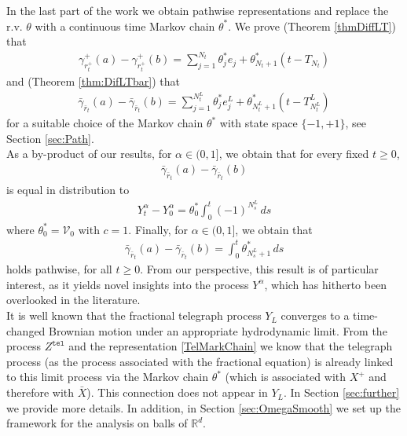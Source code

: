 \documentclass[10pt,a4paper]{article}
\numberwithin{equation}{section}
\theoremstyle{plain}
\theoremstyle{remark}
\begin{document}
In the last part of the work we obtain pathwise representations and replace the r.v. $\theta$ with a continuous time Markov chain $\theta^*$. We prove (Theorem \ref{thmDiffLT}) that
\begin{align}
\gamma^+_{r^+_t}(a) - \gamma^+_{r^+_t}(b) = \sum_{j=1}^{N_t} \theta^*_j e_j + \theta^*_{N_t + 1} \left( t - T_{N_t} \right)
\label{MarkChain}
\end{align}
and (Theorem \ref{thm:DifLTbar}) that
\begin{align}
\bar{\gamma}_{\bar{r}_t}(a) - \bar{\gamma}_{\bar{r}_t}(b) = \sum_{j=1}^{N^L_t} \theta^*_j e^L_j + \theta^*_{N^L_t+1} \left( t - T^L_{N^L_t} \right)
\label{TelMarkChain}
\end{align}
for a suitable choice of the Markov chain $\theta^*$ with state space $\{-1, +1\}$, see Section \ref{sec:Path}.\\ 

As a by-product of our results, for $\alpha \in (0,1]$, we obtain that for every fixed $t\geq 0$, 
\begin{align*}
\bar{\gamma}_{\bar{r}_t}(a) - \bar{\gamma}_{\bar{r}_t}(b) 
\end{align*}
is equal in distribution to
\begin{align*}
Y^\alpha_t - Y^\alpha_0 = \theta^*_0 \int_0^t (-1)^{N^L_s}\, ds
\end{align*}
where $\theta^*_0 = \mathcal{V}_0$ with $c=1$. Finally, for $\alpha \in (0,1]$, we obtain that 
\begin{align*}
\bar{\gamma}_{\bar{r}_t}(a) - \bar{\gamma}_{\bar{r}_t}(b) = \int_0^t \theta^*_{N^L_s + 1}\,  ds 
\end{align*}
holds pathwise, for all $t \geq 0$. From our perspective, this result is of particular interest, as it yields novel insights into the process $Y^{\alpha}$, which has hitherto been overlooked in the literature.\\


It is well known that the fractional telegraph process $Y_L$ converges to a time-changed Brownian motion under an appropriate hydrodynamic limit. From the process $Z^\mathtt{tel}$ and the representation \eqref{TelMarkChain} we know that the telegraph process (as the process associated with the fractional equation) is already linked to this limit process via the Markov chain $\theta^*$ (which is associated with $X^+$ and therefore with $\bar{X}$). This connection does not appear in $Y_L$. In Section \ref{sec:further} we provide more details. In addition, in Section \ref{sec:OmegaSmooth} we set up the framework for the analysis on balls of $\mathbb{R}^d$. \\
\end{document}
